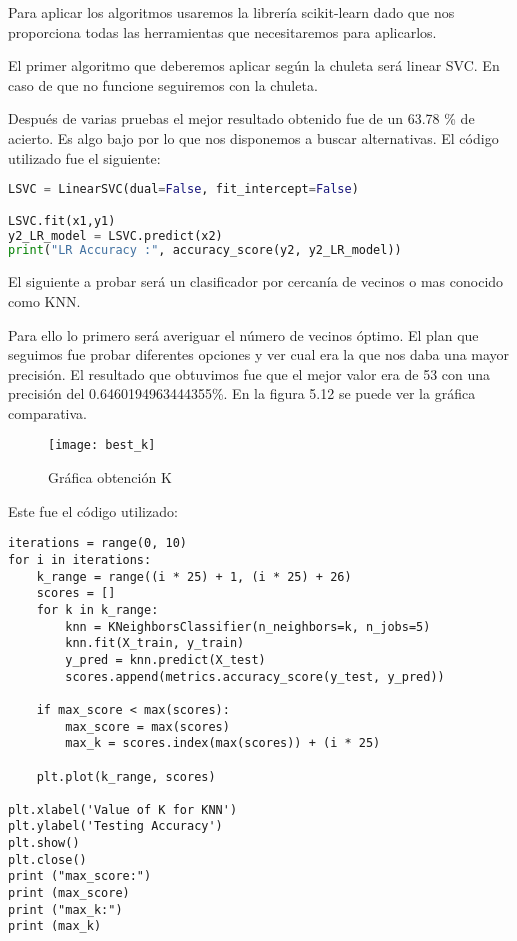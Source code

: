 Para aplicar los algoritmos usaremos la librería scikit-learn dado que nos proporciona
todas las herramientas que necesitaremos para aplicarlos.

El primer algoritmo que deberemos aplicar según la chuleta será linear SVC. En caso
de que no funcione seguiremos con la chuleta.

Después de varias pruebas el mejor resultado obtenido fue de un 63.78 \% de acierto. Es
algo bajo por lo que nos disponemos a buscar alternativas. El código utilizado fue el siguiente:

\begin{lstlisting}[language=python]
LSVC = LinearSVC(dual=False, fit_intercept=False)

LSVC.fit(x1,y1)
y2_LR_model = LSVC.predict(x2)
print("LR Accuracy :", accuracy_score(y2, y2_LR_model))
\end{lstlisting}

El siguiente a probar será un clasificador por cercanía de vecinos o mas conocido como KNN.

Para ello lo primero será averiguar el número de vecinos óptimo. El plan que seguimos
fue probar diferentes opciones y ver cual era la que nos daba una mayor precisión. El resultado
que obtuvimos fue que el mejor valor era de 53 con una precisión del 0.6460194963444355\%.
En la figura 5.12 se puede ver la gráfica comparativa.

\begin{figure}[htb]
  \centering
    \texttt{[image: best\_k]}
  \caption[Gráfica obtención K]{Gráfica obtención K}
  \label{fig:Gráfica obtención K}
\end{figure}

Este fue el código utilizado:

\begin{lstlisting}
iterations = range(0, 10)
for i in iterations:
    k_range = range((i * 25) + 1, (i * 25) + 26)
    scores = []
    for k in k_range:
        knn = KNeighborsClassifier(n_neighbors=k, n_jobs=5)
        knn.fit(X_train, y_train)
        y_pred = knn.predict(X_test)
        scores.append(metrics.accuracy_score(y_test, y_pred))

    if max_score < max(scores):
        max_score = max(scores)
        max_k = scores.index(max(scores)) + (i * 25)

    plt.plot(k_range, scores)

plt.xlabel('Value of K for KNN')
plt.ylabel('Testing Accuracy')
plt.show()
plt.close()
print ("max_score:")
print (max_score)
print ("max_k:")
print (max_k)
\end{lstlisting}

